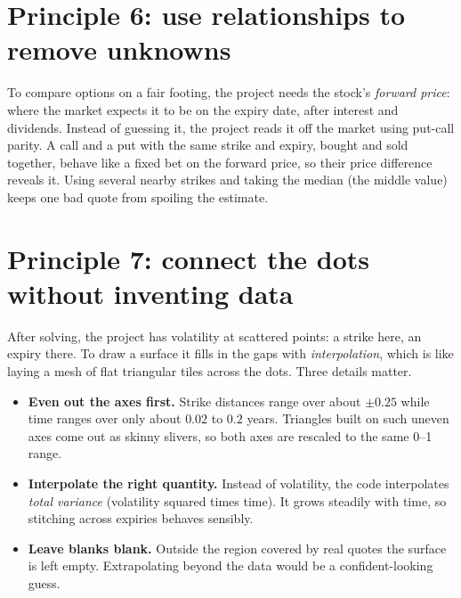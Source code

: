 \documentclass[11pt]{article}
\begin{document}
\section{Principle 6: use relationships to remove unknowns}
To compare options on a fair footing, the project needs the stock's \emph{forward price}: where the market expects it to be on the expiry date, after interest and dividends. Instead of guessing it, the project reads it off the market using put-call parity. A call and a put with the same strike and expiry, bought and sold together, behave like a fixed bet on the forward price, so their price difference reveals it. Using several nearby strikes and taking the median (the middle value) keeps one bad quote from spoiling the estimate.

\section{Principle 7: connect the dots without inventing data}
After solving, the project has volatility at scattered points: a strike here, an expiry there. To draw a surface it fills in the gaps with \emph{interpolation}, which is like laying a mesh of flat triangular tiles across the dots. Three details matter.
\begin{itemize}[leftmargin=1.5em]
\item \textbf{Even out the axes first.} Strike distances range over about $\pm 0.25$ while time ranges over only about $0.02$ to $0.2$ years. Triangles built on such uneven axes come out as skinny slivers, so both axes are rescaled to the same 0--1 range.
\item \textbf{Interpolate the right quantity.} Instead of volatility, the code interpolates \emph{total variance} (volatility squared times time). It grows steadily with time, so stitching across expiries behaves sensibly.
\item \textbf{Leave blanks blank.} Outside the region covered by real quotes the surface is left empty. Extrapolating beyond the data would be a confident-looking guess.
\end{itemize}
\end{document}
